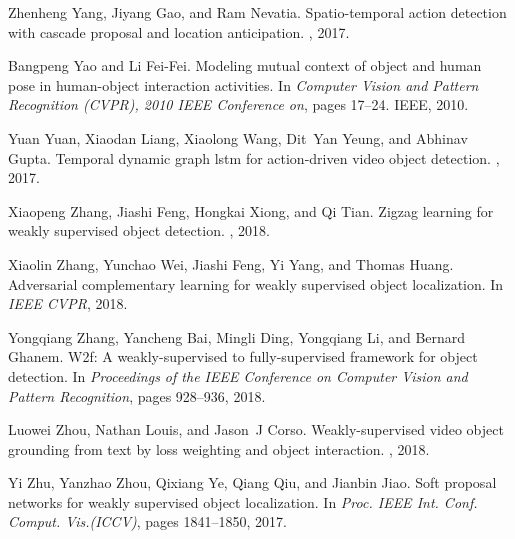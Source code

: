 \documentclass[10pt,twocolumn,letterpaper]{article}
\begin{document}
{\begin{thebibliography}{10}
Zhenheng Yang, Jiyang Gao, and Ram Nevatia.
\newblock Spatio-temporal action detection with cascade proposal and location
  anticipation.
, 2017.

Bangpeng Yao and Li Fei-Fei.
\newblock Modeling mutual context of object and human pose in human-object
  interaction activities.
\newblock In {\em Computer Vision and Pattern Recognition (CVPR), 2010 IEEE
  Conference on}, pages 17--24. IEEE, 2010.

Yuan Yuan, Xiaodan Liang, Xiaolong Wang, Dit~Yan Yeung, and Abhinav Gupta.
\newblock Temporal dynamic graph lstm for action-driven video object detection.
, 2017.

Xiaopeng Zhang, Jiashi Feng, Hongkai Xiong, and Qi Tian.
\newblock Zigzag learning for weakly supervised object detection.
, 2018.

Xiaolin Zhang, Yunchao Wei, Jiashi Feng, Yi Yang, and Thomas Huang.
\newblock Adversarial complementary learning for weakly supervised object
  localization.
\newblock In {\em IEEE CVPR}, 2018.

Yongqiang Zhang, Yancheng Bai, Mingli Ding, Yongqiang Li, and Bernard Ghanem.
\newblock W2f: A weakly-supervised to fully-supervised framework for object
  detection.
\newblock In {\em Proceedings of the IEEE Conference on Computer Vision and
  Pattern Recognition}, pages 928--936, 2018.

Luowei Zhou, Nathan Louis, and Jason~J Corso.
\newblock Weakly-supervised video object grounding from text by loss weighting
  and object interaction.
, 2018.

Yi Zhu, Yanzhao Zhou, Qixiang Ye, Qiang Qiu, and Jianbin Jiao.
\newblock Soft proposal networks for weakly supervised object localization.
\newblock In {\em Proc. IEEE Int. Conf. Comput. Vis.(ICCV)}, pages 1841--1850,
  2017.

\end{thebibliography}
 }
\end{document}
